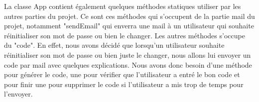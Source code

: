 \begin{flushleft}
La classe App contient également quelques méthodes statiques utiliser par les autres parties du projet. Ce sont ces méthodes qui s'occupent de la partie mail du projet, notamment "sendEmail" qui enverra une mail à un utilisateur qui souhaite réinitialiser son mot de passe ou bien le changer. Les autres méthodes s'occupe du "code". En effet, nous avons décidé que lorsqu'un utilisateur souhaite réinitialiser son mot de passe ou bien juste le changer, nous allons lui envoyer un code par mail avec quelques explications. Nous avons donc besoin d'une méthode pour générer le code, une pour vérifier que l'utilisateur a entré le bon code et pour finir une pour supprimer le code si l'utilisateur a mis trop de temps pour l'envoyer.
\end{flushleft}